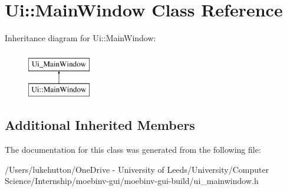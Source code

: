 \hypertarget{class_ui_1_1_main_window}{}\section{Ui\+:\+:Main\+Window Class Reference}
\label{class_ui_1_1_main_window}
Inheritance diagram for Ui\+:\+:Main\+Window\+:\begin{figure}[H]
\begin{center}
\leavevmode
\includegraphics[height=2.000000cm]{class_ui_1_1_main_window}
\end{center}
\end{figure}
\subsection*{Additional Inherited Members}


The documentation for this class was generated from the following file\+:\begin{DoxyCompactItemize}
\item 
/\+Users/lukehutton/\+One\+Drive -\/ University of Leeds/\+University/\+Computer Science/\+Internship/moebinv-\/gui/moebinv-\/gui-\/build/ui\+\_\+mainwindow.\+h\end{DoxyCompactItemize}

